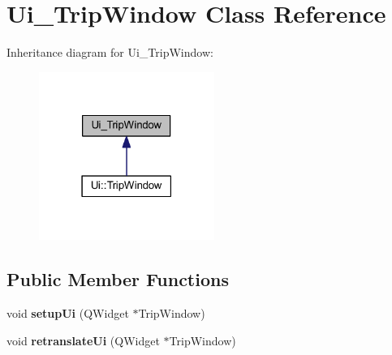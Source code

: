 \hypertarget{class_ui___trip_window}{}\section{Ui\+\_\+\+Trip\+Window Class Reference}
\label{class_ui___trip_window}


Inheritance diagram for Ui\+\_\+\+Trip\+Window\+:
\nopagebreak
\begin{figure}[H]
\begin{center}
\leavevmode
\includegraphics[width=162pt]{class_ui___trip_window__inherit__graph}
\end{center}
\end{figure}
\subsection*{Public Member Functions}
\begin{DoxyCompactItemize}
\item 
\mbox{\label{class_ui___trip_window_a42dbbe827a8e59f90d532bc9febed469}} 
void {\bfseries setup\+Ui} (Q\+Widget $\ast$Trip\+Window)
\item 
\mbox{\label{class_ui___trip_window_a9695983139e7fd78cee61c7a8b920bf8}} 
void {\bfseries retranslate\+Ui} (Q\+Widget $\ast$Trip\+Window)
\end{DoxyCompactItemize}
